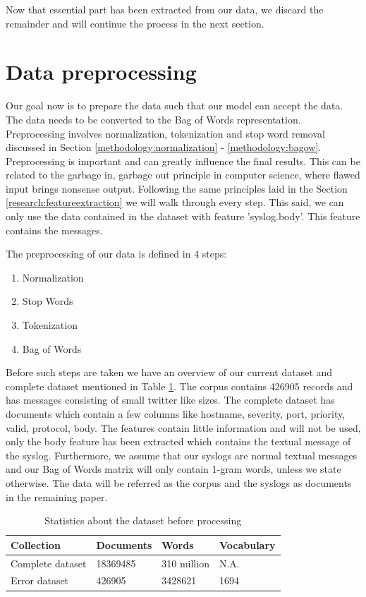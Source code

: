 Now that essential part has been extracted from our data, we discard the remainder and will continue the process in the next section. 


\section{Data preprocessing}\label{methodology:Text preprocessing}
Our goal now is to prepare the data such that our model can accept the data. The data needs to be converted to the Bag of Words representation. Preprocessing involves normalization, tokenization and stop word removal discussed in Section \ref{methodology:normalization} - \ref{methodology:bagow}. Preprocessing is important and can greatly influence the final results. This can be related to the garbage in, garbage out principle in computer science, where flawed input brings nonsense output. Following the same principles laid in the Section \ref{research:featureextraction} we will walk through every step. This said, we can only use the data contained in the dataset with feature 'syslog.body'. This feature contains the messages. 

The preprocessing of our data is defined in 4 steps:
\begin{enumerate}
    \item Normalization
    \item Stop Words
    \item Tokenization
    \item Bag of Words
\end{enumerate}

Before such steps are taken we have an overview of our current dataset and complete dataset mentioned in Table \ref{tab:tablestatistics}. The corpus contains 426905 records and has messages consisting of small twitter like sizes. The complete dataset has documents which contain a few columns like hostname, severity, port, priority, valid, protocol, body. The features contain little information and will not be used, only the body feature has been extracted which contains the textual message of the syslog. Furthermore, we assume that our syslogs are normal textual messages and our Bag of Words matrix will only contain 1-gram words, unless we state otherwise.  
The data will be referred as the corpus and the syslogs as documents in the remaining paper. 


\begin{table}[h]
\centering
 \begin{tabular}{|l|l|l|l|} 
 \hline
 Collection & Documents & Words & Vocabulary  \\ [0.5ex] 
 \hline\hline
 Complete dataset & 18369485 & 310 million & N.A.  \\ 
 Error dataset & 426905 & 3428621 & 1694 \\
 \hline
 \end{tabular}
\caption{Statistics about the dataset before processing}
\label{tab:tablestatistics}
\end{table}

